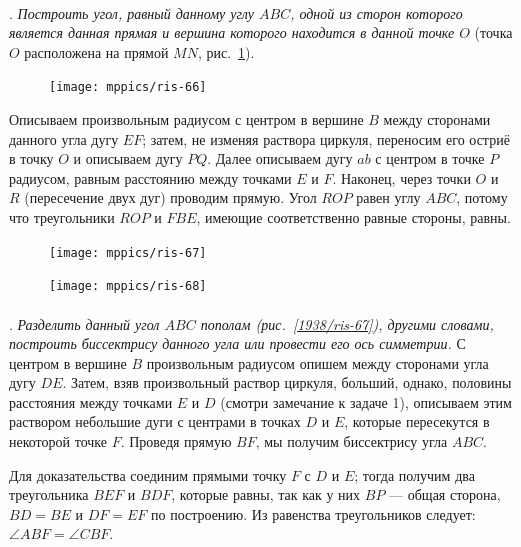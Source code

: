 \documentclass[oneside]{book}
\begin{document}
\paragraph{}\label{1938/63}
.
\emph{Построить угол, равный данному углу $ABC$, одной из сторон которого является данная прямая и вершина которого находится в данной точке $O$} (точка $O$ расположена на прямой $MN$, рис.~\ref{1938/ris-66}).

\begin{figure}[h!]
\centering
\texttt{[image: mppics/ris-66]}
\caption{}\label{1938/ris-66}
\end{figure}

Описываем произвольным радиусом с центром в вершине $B$ между сторонами данного угла дугу $EF$;
затем, не изменяя раствора циркуля, переносим его остриё в точку $O$ и описываем дугу $PQ$.
Далее описываем дугу $ab$ с центром в точке $P$ радиусом, равным расстоянию между точками $E$ и $F$.
Наконец, через точки $O$ и $R$ (пересечение двух дуг) проводим прямую.
Угол $ROP$ равен углу $ABC$, потому что треугольники $ROP$ и $FBE$, имеющие соответственно равные стороны, равны.

\begin{figure}
\vskip-4mm
\centering
\texttt{[image: mppics/ris-67]}
\caption{}\label{1938/ris-67}
\bigskip
\texttt{[image: mppics/ris-68]}
\caption{}\label{1938/ris-68}
\end{figure}

\paragraph{}\label{1938/64}
\mbox{.}
\emph{Разделить данный угол $ABC$ пополам (рис.~\ref{1938/ris-67}), другими словами, построить биссектрису данного угла или провести его ось симметрии.}
С центром в вершине $B$ произвольным радиусом опишем между сторонами угла дугу $DE$.
Затем, взяв произвольный раствор циркуля, больший, однако, половины расстояния между точками $E$ и $D$ (смотри замечание к задаче 1), описываем этим раствором небольшие дуги с центрами в точках $D$ и $E$, которые пересекутся в некоторой точке $F$.
Проведя прямую $BF$, мы получим биссектрису угла $ABC$.


Для доказательства соединим прямыми точку $F$ с $D$ и $E$;
тогда получим два треугольника $BEF$ и $BDF$, которые равны, так как у них $BP$ — общая сторона, $BD=BE$ и $DF=EF$ по построению.
Из равенства треугольников следует:
$\angle ABF = \angle CBF$.
\end{document}

